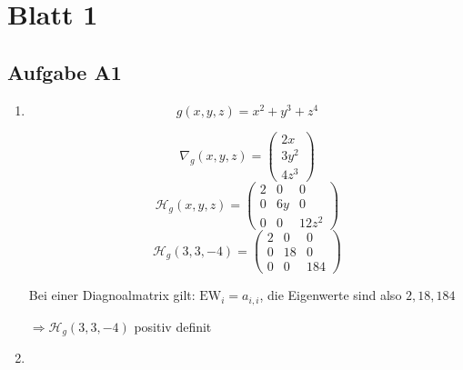 \documentclass[fleqn,13pt]{scrartcl}
\begin{document}
\section*{Blatt 1}
\subsection*{Aufgabe A1}

\begin{enumerate}
	\item
		\begin{equation*}
			g(x,y,z) = x^2 + y^3 + z^4 
		\end{equation*}

		\begin{equation*}
			\nabla_g(x,y,z) =
			\begin{pmatrix}
				2x \\
				3y^2 \\
				4z^3
			\end{pmatrix}
		\end{equation*}
		\begin{equation*}
			\mathcal{H}_g(x,y,z) =
			\begin{pmatrix}
				2 & 0 & 0 \\
				0 & 6y & 0 \\
				0 & 0 & 12z^2
			\end{pmatrix}
		\end{equation*}
		\begin{equation*}
			\mathcal{H}_g(3,3,-4) =
			\begin{pmatrix}
				2 & 0 & 0 \\
				0 & 18 & 0 \\
				0 & 0 & 184
			\end{pmatrix}
		\end{equation*}

		Bei einer Diagnoalmatrix gilt: $\text{EW}_i = a_{i,i}$, die Eigenwerte sind also $2, 18, 184$

		$\Rightarrow \mathcal{H}_g(3,3,-4)$ positiv definit

	\item


\end{enumerate}
\end{document}
